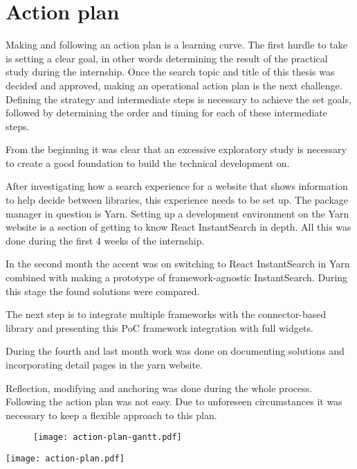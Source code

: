
\chapter{Action plan}
\label{chp:action_plan}

Making and following an action plan is a learning curve. The first hurdle to take is setting a clear goal, in other words determining the result of the practical study during the internship.  Once the search topic and title of this thesis was decided and approved, making an operational action plan is the next challenge. Defining the strategy and intermediate steps is necessary to achieve the set goals, followed by determining the order and timing for each of these intermediate steps.

From the beginning it was clear that an excessive exploratory study is necessary to create a good foundation to build the technical development on. 

After investigating how a search experience for a website that shows information to help decide between libraries, this experience needs to be set up. The package manager in question is Yarn. Setting up a development environment on the Yarn website is a section of getting to know React InstantSearch in depth. All this was done during the first 4 weeks of the internship.

In the second month the accent was on switching to React InstantSearch in Yarn combined with making a prototype of framework-agnostic InstantSearch. During this stage the found solutions were compared. 

The next step is to integrate multiple frameworks with the connector-based library and presenting this PoC framework integration with full widgets.

During the fourth and last month work was done on documenting solutions and incorporating detail pages in the yarn website.

Reflection, modifying and anchoring was done during the whole process. Following the action plan was not easy. Due to unforeseen circumstances it was necessary to keep a flexible approach to this plan.

\begin{figure}
  \centering
  \texttt{[image: action-plan-gantt.pdf]}
\end{figure}

\newpage

\texttt{[image: action-plan.pdf]}
